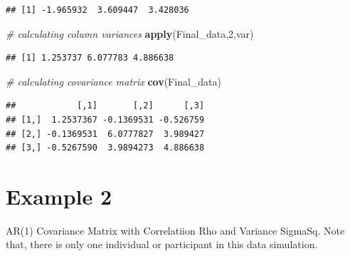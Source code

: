 \documentclass[]{book}
\newenvironment{Shaded}{\begin{snugshade}}{\end{snugshade}}
\newcommand{\CommentTok}[1]{\textcolor[rgb]{0.56,0.35,0.01}{\textit{#1}}}
\newcommand{\DecValTok}[1]{\textcolor[rgb]{0.00,0.00,0.81}{#1}}
\newcommand{\KeywordTok}[1]{\textcolor[rgb]{0.13,0.29,0.53}{\textbf{#1}}}
\newcommand{\NormalTok}[1]{#1}
\begin{document}
\begin{verbatim}
## [1] -1.965932  3.609447  3.428036
\end{verbatim}

\begin{Shaded}
\begin{Highlighting}[]
\CommentTok{# calculating column variances}
\KeywordTok{apply}\NormalTok{(Final_data,}\DecValTok{2}\NormalTok{,var)}
\end{Highlighting}
\end{Shaded}

\begin{verbatim}
## [1] 1.253737 6.077783 4.886638
\end{verbatim}

\begin{Shaded}
\begin{Highlighting}[]
\CommentTok{# calculating covariance matrix}
\KeywordTok{cov}\NormalTok{(Final_data)}
\end{Highlighting}
\end{Shaded}

\begin{verbatim}
##            [,1]       [,2]      [,3]
## [1,]  1.2537367 -0.1369531 -0.526759
## [2,] -0.1369531  6.0777827  3.989427
## [3,] -0.5267590  3.9894273  4.886638
\end{verbatim}

\hypertarget{example-2}{%
\section{Example 2}\label{example-2}}

AR(1) Covariance Matrix with Correlatiion Rho and Variance SigmaSq. Note that, there is only one individual or participant in this data simulation.
\end{document}
